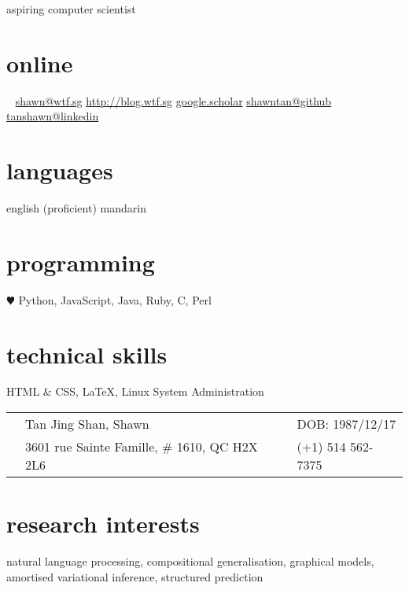 \documentclass[]{friggeri-cv}
\begin{document}
{aspiring computer scientist

}

\begin{aside}
	\section{online}
	\Email~ \href{mailto:shawn@wtf.sg}{shawn@wtf.sg}
	\href{https://blog.wtf.sg}{http://blog.wtf.sg}
	\href{https://scholar.google.ca/citations?user=57Nf7EYAAAAJ&hl=en}{google.scholar}
	\href{http://github.com/shawntan}{shawntan@github}
	\href{http://sg.linkedin.com/in/tanshawn}{tanshawn@linkedin}
	\section{languages}
	english (proficient)
	mandarin
	\section{programming}
	{\color{red} $\varheartsuit$} Python, JavaScript, Java, Ruby, C, Perl
	\section{technical skills}
	HTML \& CSS, \LaTeX,
	Linux System Administration
\end{aside}
\begin{tabular}{ p{0.45cm} p{8cm} p{0.45cm} p{6.5cm} }
	\Male 	& Tan Jing Shan, Shawn	 & \Sagittarius &  DOB: 1987/12/17\\
	\Letter & 3601 rue Sainte Famille, \# 1610, QC H2X 2L6 & \Mobilefone & (+1) 
	514 562-7375\\
\end{tabular}


\iftoggle{short}{}%
{
\section{about}
I'm currently a PhD student at the University of Montreal, where I work at the 
Montreal Institute of Learning Algorithms (MILA). \iftoggle{short}{}{I enjoy 
working on machine learning projects, and keeping up with the latest in neural 
networks research. I maintain a \href{http://blog.wtf.sg}{blog} where I write 
about my machine learning projects.}

}
\section{research interests}
natural language processing, compositional generalisation, graphical models, 
amortised variational inference, structured prediction
\end{document}

